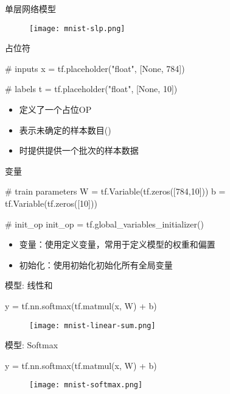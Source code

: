 \begin{frame}{单层网络模型}
  \begin{figure}
    \centering
    \texttt{[image: mnist-slp.png]}
  \end{figure}
\end{frame}

\begin{frame}[fragile]{占位符}
\begin{python}
# inputs
x  = tf.placeholder("float", [None, 784])  

# labels
t = tf.placeholder("float", [None, 10])
\end{python}

\begin{itemize}
  \item {}定义了一个占位OP
  \item {}表示未确定的样本数目()
  \item {}时提供提供一个批次的样本数据
\end{itemize}
\end{frame}

\begin{frame}[fragile]{变量}
\begin{python}
# train parameters
W = tf.Variable(tf.zeros([784,10]))
b = tf.Variable(tf.zeros([10]))

# init\_op
init_op = tf.global_variables_initializer()
\end{python}

\begin{itemize}
  \item \alert{变量}：使用定义变量，常用于定义模型的权重和偏置
  \item \alert{初始化}：使用初始化初始化所有全局变量 
\end{itemize}
\end{frame}

\begin{frame}[fragile]{模型: 线性和}
  \begin{python}
y = tf.nn.softmax(tf.matmul(x, W) + b)
  \end{python}

  \begin{figure}
    \centering
    \texttt{[image: mnist-linear-sum.png]}
  \end{figure}
\end{frame}

\begin{frame}[fragile]{模型: Softmax}
  \begin{python}
y = tf.nn.softmax(tf.matmul(x, W) + b)
  \end{python}

  \begin{figure}
    \centering
    \texttt{[image: mnist-softmax.png]}
  \end{figure}
\end{frame}

